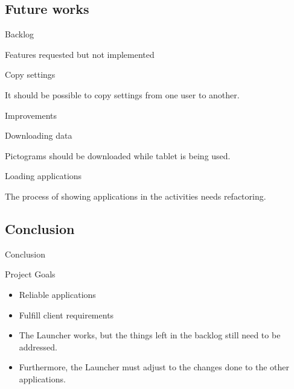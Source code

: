 \subsection{Future works}
\begin{frame}{Backlog}
	
	\begin{block}{Features requested but not implemented}
	\begin{description}
		\item[Copy settings]{}
		\end{description}
	\vspace{-0.5em}
		It should be possible to copy settings from one user to another.
	\end{block}
	\vspace{\baselineskip}
	
	\begin{block}{Improvements}
	\begin{description}
		\item[Downloading data]{}
	\end{description}
	\vspace{-0.5em}
	Pictograms should be downloaded while tablet is being used.
	\vspace{1em}
	\begin{description}
		\item[Loading applications]{}
	\end{description}
	\vspace{-0.5em}
	The process of showing applications in the activities needs refactoring.
	\end{block}
\end{frame}

\subsection{Conclusion}
\begin{frame}{Conclusion}
\begin{block}{Project Goals}
	\begin{itemize}
		\item Reliable applications
		\item Fulfill client requirements
	\end{itemize}
\end{block}
\vspace{1em}
\pause
\begin{itemize}
\item<2,3> The Launcher works, but the things left in the backlog still need to be addressed.
\item<3> Furthermore, the Launcher must adjust to the changes done to the other applications.
\end{itemize}

\end{frame}